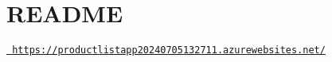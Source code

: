 \chapter{README}
\hypertarget{md__r_e_a_d_m_e}{}\label{md__r_e_a_d_m_e}
\href{https://productlistapp20240705132711.azurewebsites.net/}{\texttt{ https\+://productlistapp20240705132711.\+azurewebsites.\+net/}} 